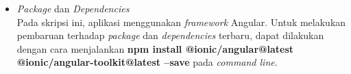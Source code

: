 \begin{enumerate}
\begin{itemize}
\begin{itemize}
		\end{itemize}
		
		\item {\it Package} dan {\it Dependencies} \\
		Pada skripsi ini, aplikasi menggunakan {\it framework} Angular. Untuk melakukan pembaruan terhadap {\it package} dan {\it dependencies} terbaru, dapat dilakukan dengan cara menjalankan \textbf{npm install @ionic/angular@latest @ionic/angular-toolkit@latest --save} pada {\it command line}.
	\end{itemize}


\end{enumerate}




%



